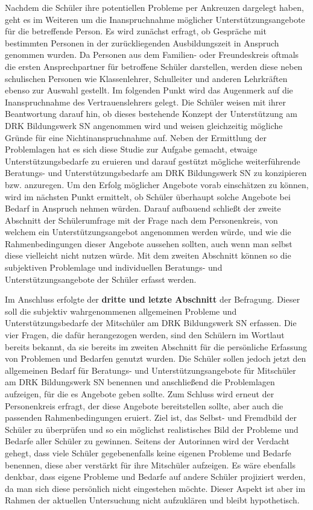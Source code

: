 \noindent
Nachdem die Schüler ihre potentiellen Probleme per Ankreuzen dargelegt haben, geht es im Weiteren um die Inanspruchnahme möglicher Unterstützungsangebote für die betreffende Person. Es wird zunächst erfragt, ob Gespräche mit bestimmten Personen in der zurückliegenden Ausbildungszeit in Anspruch genommen wurden. Da Personen aus dem Familien- oder Freundeskreis oftmals die ersten Ansprechpartner für betroffene Schüler darstellen, werden diese neben schulischen Personen wie Klassenlehrer, Schulleiter und anderen Lehrkräften ebenso zur Auswahl gestellt. Im folgenden Punkt wird das Augenmerk auf die Inanspruchnahme des Vertrauenslehrers gelegt. Die Schüler weisen mit ihrer Beantwortung darauf hin, ob dieses bestehende Konzept der Unterstützung am DRK Bildungswerk SN angenommen wird und weisen gleichzeitig mögliche Gründe für eine Nichtinanspruchnahme auf. Neben der Ermittlung der Problemlagen hat es sich diese Studie zur Aufgabe gemacht, etwaige Unterstützungsbedarfe zu eruieren und darauf gestützt mögliche weiterführende Beratungs- und Unterstützungsbedarfe am DRK Bildungswerk SN zu konzipieren bzw. anzuregen. Um den Erfolg möglicher Angebote vorab einschätzen zu können, wird im nächsten Punkt ermittelt, ob Schüler überhaupt solche Angebote bei Bedarf in Anspruch nehmen würden. Darauf aufbauend schließt der zweite Abschnitt der Schülerumfrage mit der Frage nach dem Personenkreis, von welchem ein Unterstützungsangebot angenommen werden würde, und wie die Rahmenbedingungen dieser Angebote aussehen sollten, auch wenn man selbst diese vielleicht nicht nutzen würde. Mit dem zweiten Abschnitt können so die subjektiven Problemlage und individuellen Beratungs- und Unterstützungsangebote der Schüler erfasst werden. 

Im Anschluss erfolgte der \textbf{dritte und letzte Abschnitt} der Befragung. Dieser soll die subjektiv wahrgenommenen allgemeinen Probleme und Unterstützungsbedarfe der Mitschüler am DRK Bildungswerk SN erfassen. Die vier Fragen, die dafür herangezogen werden, sind den Schülern im Wortlaut bereits bekannt, da sie bereits im zweiten Abschnitt für die persönliche Erfassung von Problemen und Bedarfen genutzt wurden. Die Schüler sollen jedoch jetzt den allgemeinen Bedarf für Beratungs- und Unterstützungsangebote für Mitschüler am DRK Bildungswerk SN benennen und anschließend die Problemlagen aufzeigen, für die es Angebote geben sollte. Zum Schluss wird erneut der Personenkreis erfragt, der diese Angebote bereitstellen sollte, aber auch die passenden Rahmenbedingungen eruiert. Ziel ist, das Selbst- und Fremdbild der Schüler zu überprüfen und so ein möglichst realistisches Bild der Probleme und Bedarfe aller Schüler zu gewinnen. Seitens der Autorinnen wird der Verdacht gehegt, dass viele Schüler gegebenenfalls keine eigenen Probleme und Bedarfe benennen, diese aber verstärkt für ihre Mitschüler aufzeigen. Es wäre ebenfalls denkbar, dass eigene Probleme und Bedarfe auf andere Schüler projiziert werden, da man sich diese persönlich nicht eingestehen möchte. Dieser Aspekt ist aber im Rahmen der aktuellen Untersuchung nicht aufzuklären und bleibt hypothetisch. 

